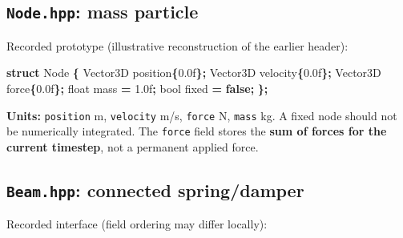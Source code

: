 \documentclass[
  10pt,
  a4paper,
]{article}
\newenvironment{Shaded}{\begin{snugshade}}{\end{snugshade}}
\newcommand{\BuiltInTok}[1]{#1}
\newcommand{\DataTypeTok}[1]{\textcolor[rgb]{0.13,0.29,0.53}{#1}}
\newcommand{\FloatTok}[1]{\textcolor[rgb]{0.00,0.00,0.81}{#1}}
\newcommand{\KeywordTok}[1]{\textcolor[rgb]{0.13,0.29,0.53}{\textbf{#1}}}
\newcommand{\NormalTok}[1]{#1}
\newcommand{\OperatorTok}[1]{\textcolor[rgb]{0.81,0.36,0.00}{\textbf{#1}}}
\begin{document}
\subsection{\texorpdfstring{\texttt{Node.hpp}: mass
particle}{Node.hpp: mass particle}}\label{node.hpp-mass-particle}

Recorded prototype (illustrative reconstruction of the earlier header):

\begin{Shaded}
\begin{Highlighting}[]
\KeywordTok{struct}\NormalTok{ Node }\OperatorTok{\{}
\NormalTok{    Vector3D position}\OperatorTok{\{}\FloatTok{0.0}\BuiltInTok{f}\OperatorTok{\};}
\NormalTok{    Vector3D velocity}\OperatorTok{\{}\FloatTok{0.0}\BuiltInTok{f}\OperatorTok{\};}
\NormalTok{    Vector3D force}\OperatorTok{\{}\FloatTok{0.0}\BuiltInTok{f}\OperatorTok{\};}
    \DataTypeTok{float}\NormalTok{ mass }\OperatorTok{=} \FloatTok{1.0}\BuiltInTok{f}\OperatorTok{;}
    \DataTypeTok{bool}\NormalTok{ fixed }\OperatorTok{=} \KeywordTok{false}\OperatorTok{;}
\OperatorTok{\};}
\end{Highlighting}
\end{Shaded}

\textbf{Units:} \texttt{position} m, \texttt{velocity} m/s,
\texttt{force} N, \texttt{mass} kg. A fixed node should not be
numerically integrated. The \texttt{force} field stores the \textbf{sum
of forces for the current timestep}, not a permanent applied force.

\subsection{\texorpdfstring{\texttt{Beam.hpp}: connected
spring/damper}{Beam.hpp: connected spring/damper}}\label{beam.hpp-connected-springdamper}

Recorded interface (field ordering may differ locally):
\end{document}
